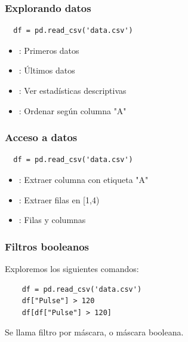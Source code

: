 \documentclass[14pt,aspectratio=169,xcolor=dvipsnames]{beamer}
\begin{document}
\begin{frame}[fragile]\frametitle{Explorando datos}
    \begin{verbatim}
  df = pd.read_csv('data.csv')
    \end{verbatim}
    \begin{itemize}
        \item {}: Primeros  datos
        \item {}: Últimos  datos
        \item {}: Ver estadísticas descriptivas
        \item {}: Ordenar según columna "A"
    \end{itemize}
    
\end{frame}
\begin{frame}[fragile]\frametitle{Acceso a datos}
    \begin{verbatim}
  df = pd.read_csv('data.csv')
    \end{verbatim}
    \begin{itemize}
        \item {}: Extraer columna con etiqueta "A"
        \item {}: Extraer filas en [1,4)
        \item {}: Filas y columnas
    \end{itemize}

\end{frame}
\begin{frame}[fragile]\frametitle{Filtros booleanos}

    Exploremos los siguientes comandos: 
    \begin{verbatim}
    df = pd.read_csv('data.csv')
    df["Pulse"] > 120
    df[df["Pulse"] > 120]
    \end{verbatim}

    \vspace{1cm}
    \pause Se llama filtro por máscara, o máscara booleana.
\end{frame}
\end{document}
